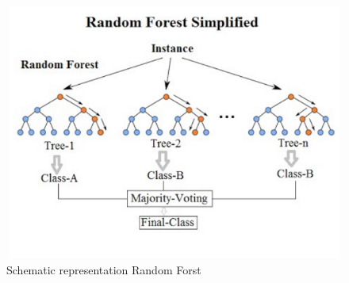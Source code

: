 



\begin{figure}[H]
   \centering
    \includegraphics[width=0.8\linewidth]{./Figures/RF_Intro.png}
    \caption{Schematic representation Random Forst}
    \label{RF_Intro}
\end{figure}

